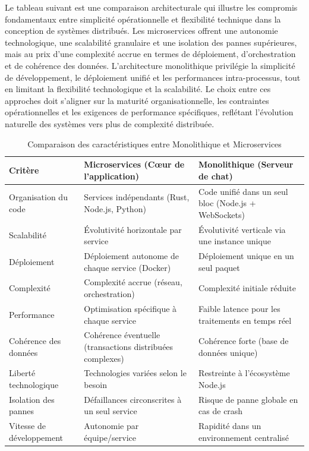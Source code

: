 \documentclass[12pt]{rapportPfe}
\begin{document}
Le tableau suivant est une comparaison architecturale qui illustre les compromis fondamentaux entre simplicité opérationnelle et flexibilité technique dans la conception de systèmes distribués. Les microservices offrent une autonomie technologique, une scalabilité granulaire et une isolation des pannes supérieures, mais au prix d'une complexité accrue en termes de déploiement, d'orchestration et de cohérence des données. L'architecture monolithique privilégie la simplicité de développement, le déploiement unifié et les performances intra-processus, tout en limitant la flexibilité technologique et la scalabilité. Le choix entre ces approches doit s'aligner sur la maturité organisationnelle, les contraintes opérationnelles et les exigences de performance spécifiques, reflétant l'évolution naturelle des systèmes vers plus de complexité distribuée.

\begin{table}[H]
\centering
\begin{tabular}{|p{4cm}|p{5.5cm}|p{5.5cm}|}
\hline
\textbf{Critère} & \textbf{Microservices (Cœur de l'application)} & \textbf{Monolithique (Serveur de chat)} \\
\hline
Organisation du code & Services indépendants (Rust, Node.js, Python) & Code unifié dans un seul bloc (Node.js + WebSockets) \\
\hline
Scalabilité & Évolutivité horizontale par service & Évolutivité verticale via une instance unique \\
\hline
Déploiement & Déploiement autonome de chaque service (Docker) & Déploiement unique en un seul paquet \\
\hline
Complexité & Complexité accrue (réseau, orchestration) & Complexité initiale réduite \\
\hline
Performance & Optimisation spécifique à chaque service & Faible latence pour les traitements en temps réel \\
\hline
Cohérence des données & Cohérence éventuelle (transactions distribuées complexes) & Cohérence forte (base de données unique) \\
\hline
Liberté technologique & Technologies variées selon le besoin & Restreinte à l’écosystème Node.js \\
\hline
Isolation des pannes & Défaillances circonscrites à un seul service & Risque de panne globale en cas de crash \\
\hline
Vitesse de développement & Autonomie par équipe/service & Rapidité dans un environnement centralisé \\
\hline
\end{tabular}
\caption{Comparaison des caractéristiques entre Monolithique et Microservices}
\label{tab:Arch-comp}
\end{table}
\end{document}
